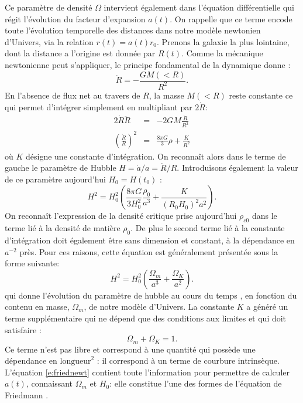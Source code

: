 Ce paramètre de densité $\Omega$ intervient également dans l'équation différentielle qui régit l'évolution du facteur d'expansion $a(t)$. On rappelle que ce terme encode toute l'évolution temporelle des distances dans notre modèle newtonien d'Univers, via la relation $r(t)=a(t)r_0$. Prenons la galaxie la plus lointaine, dont la distance a l'origine est donnée par $R(t)$. Comme la mécanique newtonienne peut s'appliquer, le principe fondamental de la dynamique donne :
\begin{equation}
\ddot R=-\frac{GM(<R)}{R^2}.
\end{equation} 
En l'absence de flux net au travers de $R$, la masse $M(<R)$ reste constante ce qui permet d'intégrer simplement en multipliant par $2\dot R$:
\begin{eqnarray}
2\dot R \ddot R &=& -2GM\frac{\dot R}{R^2}\\
\left(\frac{\dot R}{R}\right)^2&=&\frac{8\pi G}{3}\rho +\frac{K}{R^2}
\end{eqnarray}
où $K$ désigne une constante d'intégration. On reconnaît alors dans le terme de gauche le paramètre de Hubble $H=\dot a/a=\dot R/R$. Introduisons également la valeur de ce paramètre aujourd'hui $H_0=H(t_0)$ :
\begin{equation}
H^2=H_0^2(\frac{8\pi G}{3H_0^2}\frac{\rho_0}{a^3}+\frac{K}{(R_0  H_0)^2 a^2}).
\end{equation}
On reconnaît l'expression de la densité critique prise aujourd'hui $\rho_{c0}$ dans le terme lié à la densité de matière $\rho_0$. De plus le second terme lié à la constante d'intégration doit également être sans dimension et constant, à la dépendance en $a^{-2}$ près. Pour ces raisons, cette équation est généralement présentée sous la forme suivante:
\begin{equation}
H^2=H_0^2(\frac{\Omega_m}{a^3}+\frac{\Omega_K}{a^2}).
\label{e:friednewt}
\end{equation}
qui donne l'évolution du paramètre de hubble au cours du temps , en fonction du contenu en masse, $\Omega_m$, de notre modèle d'Univers. La constante $K$ a généré un terme supplémentaire qui ne dépend que des conditions aux limites et qui doit satisfaire :
\begin{equation}
\Omega_m+\Omega_K=1.
\end{equation}
Ce terme n'est pas libre et correspond à une quantité qui possède une dépendance en $\mathrm{longueur}^2$ : il correspond à un terme de courbure intrinsèque. L'équation \ref{e:friednewt} contient toute l'information pour permettre de calculer $a(t)$, connaissant $\Omega_m$ et $H_0$: elle constitue l'une des formes de l'équation de Friedmann .

